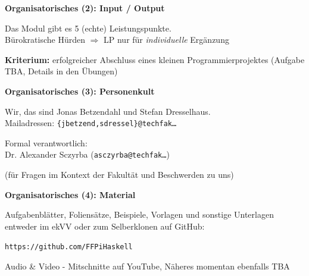 \documentclass[unknownkeysallowed]{beamer}
\begin{document}
  
  \begin{frame}
    \Large\textbf{Organisatorisches (2): Input / Output}\bigskip \normalsize
    
    Das Modul gibt es 5 (echte) Leistungspunkte.\\
    Bürokratische Hürden $\Rightarrow$ LP nur für \emph{individuelle} Ergänzung \bigskip
    
    \textbf{Kriterium:} erfolgreicher Abschluss eines kleinen Programmierprojektes
    (Aufgabe TBA, Details in den Übungen)
  \end{frame}
  
  
  \begin{frame}
    \Large\textbf{Organisatorisches (3): Personenkult}\bigskip \normalsize

	Wir, das sind Jonas Betzendahl und Stefan Dresselhaus.\\
	Mailadressen: \texttt{\{jbetzend,sdressel\}@techfak\dots}\\ \bigskip
    
    Formal verantwortlich:\\Dr. Alexander Sczyrba (\texttt{asczyrba@techfak\dots})
    
    (für Fragen im Kontext der Fakultät und Beschwerden zu uns)
  \end{frame}
  
  
  \begin{frame}
	\Large\textbf{Organisatorisches (4): Material}\bigskip \normalsize
	
	Aufgabenblätter, Foliensätze, Beispiele, Vorlagen und sonstige Unterlagen entweder im ekVV oder zum Selberklonen auf GitHub:
	
	\bigskip\texttt{https://github.com/FFPiHaskell}\bigskip
	
	Audio \& Video - Mitschnitte auf YouTube, Näheres momentan ebenfalls TBA
  \end{frame}
  
\end{document}
